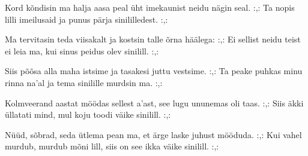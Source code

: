 Kord k\~ondisin ma halja aasa peal
\"uht imekaunist neidu n\"agin seal.
:,: Ta nopis lilli imeilusaid
    ja punus p\"arja sinililledest. :,: 

Ma tervitasin teda viisakalt
ja kostsin talle \~orna h\"a\"alega:
:,: Ei sellist neidu teist ei leia ma,
    kui sinus peidus olev sinilill. :,: 

Siis p\~o\~osa alla maha istsime
ja tasakesi juttu vestsime.
:,: Ta peake puhkas minu rinna na'al
    ja tema sinilille murdsin ma. :,: 

Kolmveerand aastat m\"o\"odas sellest a'ast,
see lugu ununemas oli taas.
:,: Siis \"akki \"ullatati mind,
    mul koju toodi v\"aike sinilill. :,: 

N\"u\"ud, s\~obrad, seda \"utlema pean ma,
et \"arge laske juhust m\"o\"oduda.
:,: Kui vahel murdub, murdub m\~oni lill,
    siis on see ikka v\"aike sinilill. :,: 
